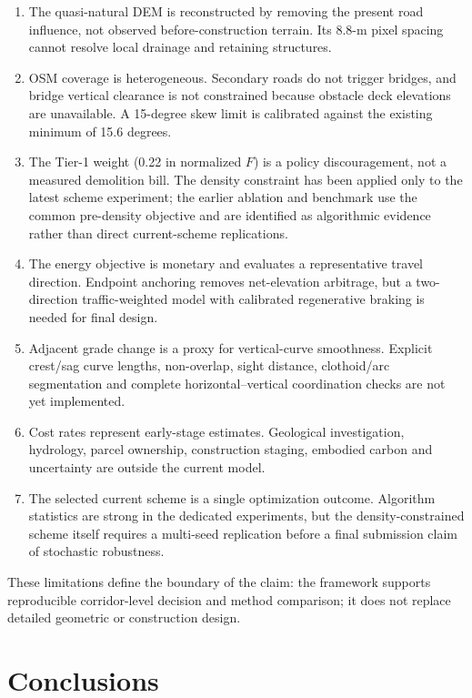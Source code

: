 \documentclass[preprint,12pt]{elsarticle}
\begin{document}
\begin{enumerate}[leftmargin=*,label=(\arabic*)]
\item The quasi-natural DEM is reconstructed by removing the present road influence, not observed before-construction terrain. Its 8.8-m pixel spacing cannot resolve local drainage and retaining structures.
\item OSM coverage is heterogeneous. Secondary roads do not trigger bridges, and bridge vertical clearance is not constrained because obstacle deck elevations are unavailable. A 15-degree skew limit is calibrated against the existing minimum of 15.6 degrees.
\item The Tier-1 weight (0.22 in normalized $F$) is a policy discouragement, not a measured demolition bill. The density constraint has been applied only to the latest scheme experiment; the earlier ablation and benchmark use the common pre-density objective and are identified as algorithmic evidence rather than direct current-scheme replications.
\item The energy objective is monetary and evaluates a representative travel direction. Endpoint anchoring removes net-elevation arbitrage, but a two-direction traffic-weighted model with calibrated regenerative braking is needed for final design.
\item Adjacent grade change is a proxy for vertical-curve smoothness. Explicit crest/sag curve lengths, non-overlap, sight distance, clothoid/arc segmentation and complete horizontal--vertical coordination checks are not yet implemented.
\item Cost rates represent early-stage estimates. Geological investigation, hydrology, parcel ownership, construction staging, embodied carbon and uncertainty are outside the current model.
\item The selected current scheme is a single optimization outcome. Algorithm statistics are strong in the dedicated experiments, but the density-constrained scheme itself requires a multi-seed replication before a final submission claim of stochastic robustness.
\end{enumerate}

These limitations define the boundary of the claim: the framework supports reproducible corridor-level decision and method comparison; it does not replace detailed geometric or construction design.

\section{Conclusions}
\end{document}
